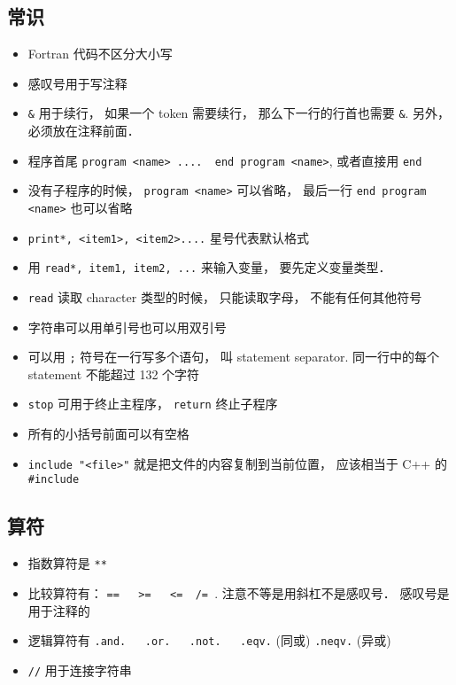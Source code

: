 
\subsection{常识}
\begin{itemize}
\item Fortran 代码不区分大小写
\item 感叹号用于写注释
\item \verb`&` 用于续行， 如果一个 token 需要续行， 那么下一行的行首也需要 \verb`&`. 另外， 必须放在注释前面．
\item 程序首尾  \verb`program <name> ....  end program <name>`, 或者直接用 \verb`end`
\item 没有子程序的时候， \verb`program <name>` 可以省略， 最后一行 \verb`end program <name>` 也可以省略
\item \verb`print*, <item1>, <item2>....` 星号代表默认格式
\item 用 \verb`read*, item1, item2, ...` 来输入变量， 要先定义变量类型． 
\item \verb`read` 读取 character 类型的时候， 只能读取字母， 不能有任何其他符号
\item 字符串可以用单引号也可以用双引号
\item 可以用 \verb`;` 符号在一行写多个语句， 叫 statement separator. 同一行中的每个 statement 不能超过 132 个字符
\item \verb`stop` 可用于终止主程序， \verb`return` 终止子程序
\item 所有的小括号前面可以有空格
\item \verb`include "<file>"` 就是把文件的内容复制到当前位置， 应该相当于 C++ 的 \verb|#include|
\end{itemize}

\subsection{算符}
\begin{itemize}
\item 指数算符是 \verb`**`
\item 比较算符有： \verb`==   >=   <=  /= `.  注意不等是用斜杠不是感叹号． 感叹号是用于注释的
\item 逻辑算符有 \verb`.and.   .or.   .not.   .eqv.` (同或)  \verb`.neqv.` (异或)
\item \verb`//` 用于连接字符串
\end{itemize}


